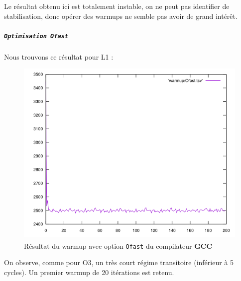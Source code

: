 \documentclass{report}
\begin{document}
  Le résultat obtenu ici est totalement instable, on ne peut pas identifier de stabilisation, donc opérer des warmups ne semble pas avoir de grand intérêt.
  \newpage
\subparagraph{ \texttt{Optimisation Ofast}}
Nous trouvons ce résultat pour L1 :
\begin{figure}[ht!]
  \centering
\includegraphics[scale=0.45]{resources/L1/warmup/Ofast.png}
  \caption{Résultat du warmup avec option \texttt{Ofast} du compilateur \textbf{GCC\textsuperscript \textcopyleft  }}
\end{figure}

On observe, comme pour O3, un très court régime transitoire (inférieur à 5 cycles). Un premier warmup de 20 itérations est retenu.

\newpage
\end{document}
